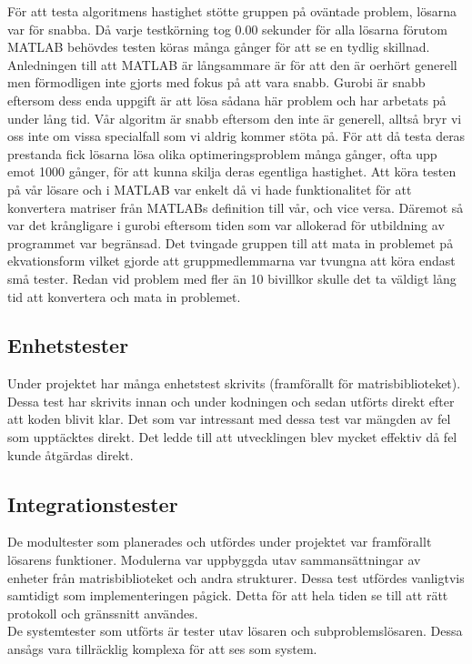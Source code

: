 	För att testa algoritmens hastighet stötte gruppen på oväntade problem, lösarna var för snabba.	Då varje testkörning tog 0.00 sekunder för alla lösarna förutom MATLAB behövdes testen köras många gånger för att se en tydlig skillnad. Anledningen till att MATLAB är långsammare är för att den är oerhört generell men förmodligen inte gjorts med fokus på att vara snabb. Gurobi är snabb eftersom dess enda uppgift är att lösa sådana här problem och har arbetats på under lång tid. Vår algoritm är snabb eftersom den inte är generell, alltså bryr vi oss inte om vissa specialfall som vi aldrig kommer stöta på. \newline
	För att då testa deras prestanda fick lösarna lösa olika optimeringsproblem många gånger, ofta upp emot 1000 gånger, för att kunna skilja deras egentliga hastighet. Att köra testen på vår lösare och i MATLAB var enkelt då vi hade funktionalitet för att konvertera matriser från MATLABs definition till vår, och vice versa. Däremot så var det krångligare i gurobi eftersom tiden som var allokerad för utbildning av programmet var begränsad. Det tvingade gruppen till att mata in problemet på ekvationsform vilket gjorde att gruppmedlemmarna var tvungna att köra endast små tester. Redan vid problem med fler än 10 bivillkor skulle det ta väldigt lång tid att konvertera och mata in problemet. \newline
	
	
	\subsection{Enhetstester}
	Under projektet har många enhetstest skrivits (framförallt för matrisbiblioteket). Dessa test har skrivits innan och under kodningen och sedan utförts direkt efter att koden blivit klar. Det som var intressant med dessa test var mängden av fel som upptäcktes direkt. Det ledde till att utvecklingen blev mycket effektiv då fel kunde åtgärdas direkt.
	
	\subsection{Integrationstester}
	De modultester som planerades och utfördes under projektet var framförallt lösarens funktioner. Modulerna var uppbyggda utav sammansättningar av enheter från matrisbiblioteket och andra strukturer. Dessa test utfördes vanligtvis samtidigt som implementeringen pågick. Detta för att hela tiden se till att rätt protokoll och gränssnitt användes.\\
De systemtester som utförts är tester utav lösaren och subproblemslösaren. Dessa ansågs vara tillräcklig komplexa för att ses som system. 
	
